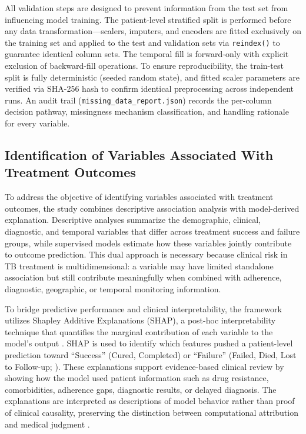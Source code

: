 \documentclass[12pt]{article}
\begin{document}
All validation steps are designed to prevent information from the test set from influencing model training. The patient-level stratified split is performed before any data transformation---scalers, imputers, and encoders are fitted exclusively on the training set and applied to the test and validation sets via \texttt{reindex()} to guarantee identical column sets. The temporal fill is forward-only with explicit exclusion of backward-fill operations. To ensure reproducibility, the train-test split is fully deterministic (seeded random state), and fitted scaler parameters are verified via SHA-256 hash to confirm identical preprocessing across independent runs. An audit trail (\texttt{missing\_data\_report.json}) records the per-column decision pathway, missingness mechanism classification, and handling rationale for every variable.

\subsection{Identification of Variables Associated With Treatment Outcomes}

To address the objective of identifying variables associated with treatment outcomes, the study combines descriptive association analysis with model-derived explanation. Descriptive analyses summarize the demographic, clinical, diagnostic, and temporal variables that differ across treatment success and failure groups, while supervised models estimate how these variables jointly contribute to outcome prediction. This dual approach is necessary because clinical risk in TB treatment is multidimensional: a variable may have limited standalone association but still contribute meaningfully when combined with adherence, diagnostic, geographic, or temporal monitoring information.

To bridge predictive performance and clinical interpretability, the framework utilizes Shapley Additive Explanations (SHAP), a post-hoc interpretability technique that quantifies the marginal contribution of each variable to the model's output \citep{lundberg2017unified}. SHAP is used to identify which features pushed a patient-level prediction toward ``Success'' (Cured, Completed) or ``Failure'' (Failed, Died, Lost to Follow-up; \citealp{ref15}). These explanations support evidence-based clinical review by showing how the model used patient information such as drug resistance, comorbidities, adherence gaps, diagnostic results, or delayed diagnosis. The explanations are interpreted as descriptions of model behavior rather than proof of clinical causality, preserving the distinction between computational attribution and medical judgment \citep{ref26, ref27}.
\end{document}
